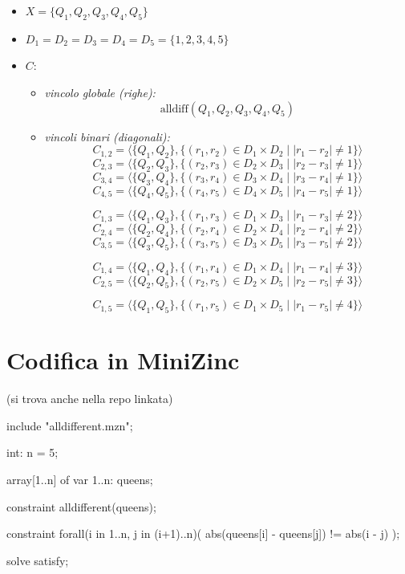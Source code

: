 \documentclass{article}
\begin{document}
\begin{itemize}
    \item $ X = \{Q_1, Q_2, Q_3, Q_4, Q_5\} $
    
    \item $ D_1 = D_2 = D_3 = D_4 = D_5 = \{1, 2, 3, 4, 5\} $
    
    \item $C$:
    
    \begin{itemize}
        \item \textit{vincolo globale (righe):}
        $$ \text{alldiff}(Q_1, Q_2, Q_3, Q_4, Q_5) $$
        
        \item \textit{vincoli binari (diagonali):} 
        $$ C_{1,2} = \langle \{Q_1, Q_2\}, \{(r_1, r_2) \in D_1 \times D_2 \mid |r_1 - r_2| \neq 1\} \rangle $$
        $$ C_{2,3} = \langle \{Q_2, Q_3\}, \{(r_2, r_3) \in D_2 \times D_3 \mid |r_2 - r_3| \neq 1\} \rangle $$
        $$ C_{3,4} = \langle \{Q_3, Q_4\}, \{(r_3, r_4) \in D_3 \times D_4 \mid |r_3 - r_4| \neq 1\} \rangle $$
        $$ C_{4,5} = \langle \{Q_4, Q_5\}, \{(r_4, r_5) \in D_4 \times D_5 \mid |r_4 - r_5| \neq 1\} \rangle $$
        
        $$ C_{1,3} = \langle \{Q_1, Q_3\}, \{(r_1, r_3) \in D_1 \times D_3 \mid |r_1 - r_3| \neq 2\} \rangle $$
        $$ C_{2,4} = \langle \{Q_2, Q_4\}, \{(r_2, r_4) \in D_2 \times D_4 \mid |r_2 - r_4| \neq 2\} \rangle $$
        $$ C_{3,5} = \langle \{Q_3, Q_5\}, \{(r_3, r_5) \in D_3 \times D_5 \mid |r_3 - r_5| \neq 2\} \rangle $$
        
        $$ C_{1,4} = \langle \{Q_1, Q_4\}, \{(r_1, r_4) \in D_1 \times D_4 \mid |r_1 - r_4| \neq 3\} \rangle $$
        $$ C_{2,5} = \langle \{Q_2, Q_5\}, \{(r_2, r_5) \in D_2 \times D_5 \mid |r_2 - r_5| \neq 3\} \rangle $$
        
        $$ C_{1,5} = \langle \{Q_1, Q_5\}, \{(r_1, r_5) \in D_1 \times D_5 \mid |r_1 - r_5| \neq 4\} \rangle $$
    \end{itemize}
\end{itemize}

\section{Codifica in MiniZinc}
(si trova anche nella repo linkata)

\begin{mznbox}{}
include "alldifferent.mzn";

int: n = 5;

array[1..n] of var 1..n: queens;

constraint alldifferent(queens);

constraint forall(i in 1..n, j in (i+1)..n)(
    abs(queens[i] - queens[j]) != abs(i - j)
);

solve satisfy;  
\end{mznbox}
\end{document}
